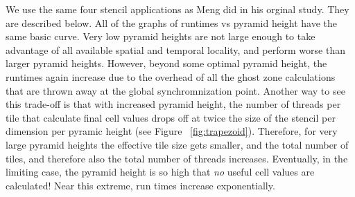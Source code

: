 \documentclass{styles/sig-alternate}
\begin{document}
We use the same four stencil applications as Meng did in his orginal study.  They are described below.
All of the graphs of runtimes vs pyramid height have the same basic curve.  Very low pyramid heights are not
large enough to take advantage of all available spatial and temporal locality, and perform worse than larger
pyramid heights.  However, beyond some optimal pyramid height, the runtimes again increase due to the overhead
of all the ghost zone calculations that are thrown away at the global synchromnization point.  Another way to
see this trade-off is that with increased pyramid height, the number of threads per tile that calculate final cell 
values drops off at twice the size of the stencil per dimension per pyramic height (see Figure ~\ref{fig:trapezoid}).  Therefore, 
for very large pyramid heights the effective tile size gets smaller, and the total number of tiles, and therefore
also the total number of threads increases.  Eventually, in the limiting case, the pyramid height is so high that 
{\em no} useful cell values are calculated!  Near this extreme, run times increase exponentially.
\end{document}
